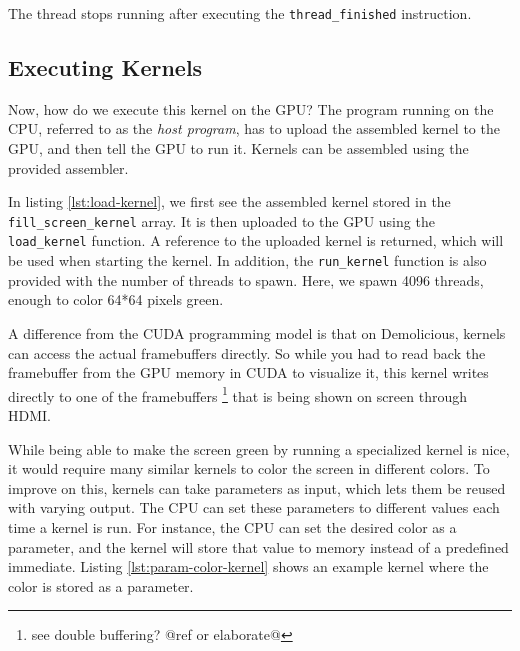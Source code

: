 \documentclass[../main/report.tex]{subfiles}
\begin{document}
The thread stops running after executing the \verb/thread_finished/ instruction.

\subsection{Executing Kernels}

Now, how do we execute this kernel on the GPU?
The program running on the CPU, referred to as the \emph{host program},
has to upload the assembled kernel to the GPU, and then tell the GPU to run it.
Kernels can be assembled using the provided assembler.


In listing \ref{lst:load-kernel}, we first see the assembled kernel stored in the
\verb/fill_screen_kernel/ array.
It is then uploaded to the GPU using the \verb/load_kernel/ function.
A reference to the uploaded kernel is returned, which will be used when starting the kernel.
In addition, the \verb/run_kernel/ function is also provided with the number of threads to spawn.
Here, we spawn 4096 threads, enough to color 64*64 pixels green.

A difference from the CUDA programming model is that on Demolicious, kernels can access the actual framebuffers directly.
So while you had to read back the framebuffer from the GPU memory in CUDA to visualize it,
this kernel writes directly to one of the framebuffers \footnote{see double buffering? @ref or elaborate@} that is being shown on screen through HDMI.

While being able to make the screen green by running a specialized kernel is nice,
it would require many similar kernels to color the screen in different colors.
To improve on this, kernels can take parameters as input,
which lets them be reused with varying output.
The CPU can set these parameters to different values each time a kernel is run.
For instance, the CPU can set the desired color as a parameter,
and the kernel will store that value to memory instead of a predefined immediate.
Listing \ref{lst:param-color-kernel} shows an example kernel where the color is stored as a parameter.
\end{document}
